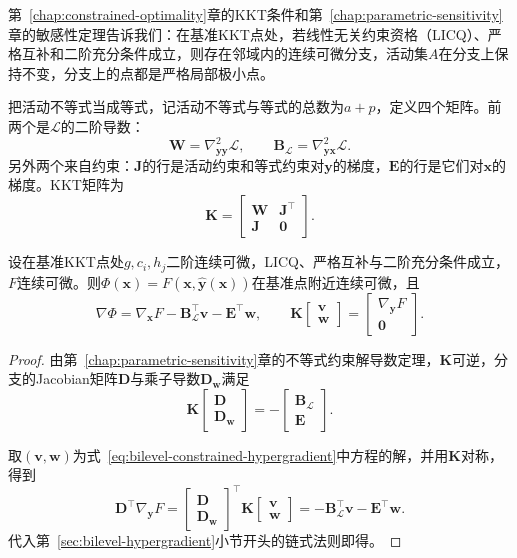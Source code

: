 第~\ref{chap:constrained-optimality}章的KKT条件和第~\ref{chap:parametric-sensitivity}章的敏感性定理告诉我们：在基准KKT点处，若线性无关约束资格（LICQ）、严格互补和二阶充分条件成立，则存在邻域内的连续可微分支，活动集$A$在分支上保持不变，分支上的点都是严格局部极小点。

把活动不等式当成等式，记活动不等式与等式的总数为$a+p$，定义四个矩阵。前两个是$\mathcal{L}$的二阶导数：
\[
 \bm{W}=\nabla^2_{\bm{y}\bm{y}}\mathcal{L},\qquad\bm{B}_{\mathcal{L}}=\nabla^2_{\bm{y}\bm{x}}\mathcal{L}.
\]
另外两个来自约束：$\bm{J}$的行是活动约束和等式约束对$\bm{y}$的梯度，$\bm{E}$的行是它们对$\bm{x}$的梯度。KKT矩阵为
\begin{equation}
 \bm{K}=\begin{bmatrix}\bm{W}&\bm{J}^{\top}\\\bm{J}&\bm{0}\end{bmatrix}.
 \label{eq:bilevel-kkt-matrix}
\end{equation}

\begin{theorem}[约束内层的隐式超梯度]
\label{thm:bilevel-constrained-hypergradient}
设在基准KKT点处$g,c_i,h_j$二阶连续可微，LICQ、严格互补与二阶充分条件成立，$F$连续可微。则$\Phi(\bm{x})=F(\bm{x},\hat{\bm{y}}(\bm{x}))$在基准点附近连续可微，且
\begin{equation}
 \nabla\Phi=\nabla_{\bm{x}}F-\bm{B}_{\mathcal{L}}^{\top}\bm{v}-\bm{E}^{\top}\bm{w},
 \qquad
 \bm{K}\begin{bmatrix}\bm{v}\\\bm{w}\end{bmatrix}=\begin{bmatrix}\nabla_{\bm{y}}F\\\bm{0}\end{bmatrix}.
 \label{eq:bilevel-constrained-hypergradient}
\end{equation}
\end{theorem}

\begin{proof}
由第~\ref{chap:parametric-sensitivity}章的不等式约束解导数定理，$\bm{K}$可逆，分支的Jacobian矩阵$\bm{D}$与乘子导数$\bm{D}_{\bm{w}}$满足
\[
 \bm{K}\begin{bmatrix}\bm{D}\\\bm{D}_{\bm{w}}\end{bmatrix}=-\begin{bmatrix}\bm{B}_{\mathcal{L}}\\\bm{E}\end{bmatrix}.
\]

取$(\bm{v},\bm{w})$为式~\eqref{eq:bilevel-constrained-hypergradient}中方程的解，并用$\bm{K}$对称，得到
\[
 \bm{D}^{\top}\nabla_{\bm{y}}F=\begin{bmatrix}\bm{D}\\\bm{D}_{\bm{w}}\end{bmatrix}^{\top}\bm{K}\begin{bmatrix}\bm{v}\\\bm{w}\end{bmatrix}=-\bm{B}_{\mathcal{L}}^{\top}\bm{v}-\bm{E}^{\top}\bm{w}.
\]
代入第~\ref{sec:bilevel-hypergradient}小节开头的链式法则即得。
\end{proof}

